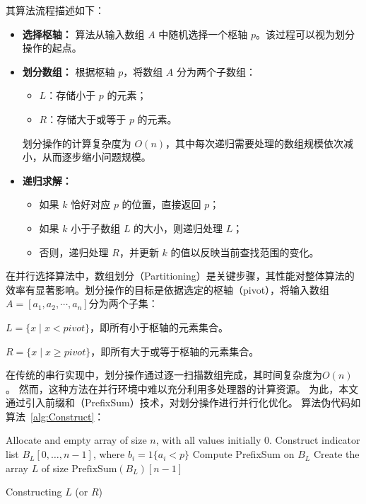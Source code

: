     其算法流程描述如下：

    \begin{itemize}
        \item \textbf{选择枢轴：}  
        算法从输入数组 $A$ 中随机选择一个枢轴 $p$。该过程可以视为划分操作的起点。
        
        \item \textbf{划分数组：}  
        根据枢轴 $p$，将数组 $A$ 分为两个子数组：
        \begin{itemize}
            \item $L$：存储小于 $p$ 的元素；
            \item $R$：存储大于或等于 $p$ 的元素。
        \end{itemize}
        划分操作的计算复杂度为 $O(n)$，其中每次递归需要处理的数组规模依次减小，从而逐步缩小问题规模。
    
        \item \textbf{递归求解：}  
        \begin{itemize}
            \item 如果 $k$ 恰好对应 $p$ 的位置，直接返回 $p$；
            \item 如果 $k$ 小于子数组 $L$ 的大小，则递归处理 $L$；
            \item 否则，递归处理 $R$，并更新 $k$ 的值以反映当前查找范围的变化。
        \end{itemize}
 
    \end{itemize}



    
    
    
    在并行选择算法中，数组划分（Partitioning）是关键步骤，其性能对整体算法的效率有显著影响。划分操作的目标是依据选定的枢轴（pivot），将输入数组\(A = [a_{1}, a_{2},\cdots, a_{n}]\)分为两个子集：

\(L = \{x \mid x < pivot\}\)，即所有小于枢轴的元素集合。

\(R = \{x \mid x \geq pivot\}\)，即所有大于或等于枢轴的元素集合。

在传统的串行实现中，划分操作通过逐一扫描数组完成，其时间复杂度为\(O(n)\)。
然而，这种方法在并行环境中难以充分利用多处理器的计算资源。
为此，本文通过引入前缀和（PrefixSum）技术，对划分操作进行并行化优化。
算法伪代码如算法~\ref{alg:Construct}：

\begin{algorithm}
    \SetAlgoLined
    Allocate and empty array of size $n$, with all values initially 0.\;
    Construct indicator list $B_L[0,\ldots,n - 1]$, where $b_i = 1\{a_i < p\}$\;
    Compute PrefixSum on $B_L$ 
    Create the array $L$ of size $\text{PrefixSum}(B_L)[n - 1]$ \;
    \caption{ Constructing $L$ (or $R$)}
    \label{alg:Construct}
  \end{algorithm}

